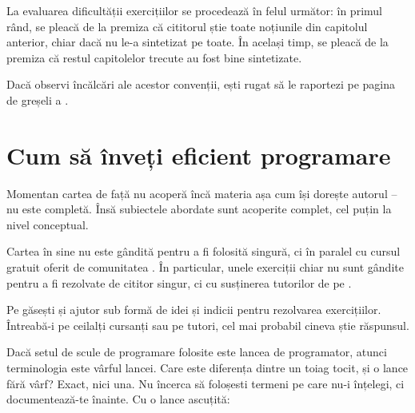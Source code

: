 La evaluarea dificultății exercițiilor se procedează în felul următor: în primul
rând, se pleacă de la premiza că cititorul știe toate noțiunile din capitolul
anterior, chiar dacă nu le-a sintetizat pe toate. În același timp, se pleacă de
la premiza că restul capitolelor trecute au fost bine sintetizate.


Dacă observi încălcări ale acestor convenții, ești rugat să le raportezi pe
pagina de greșeli a {\phpro}.

\section*{Cum să înveți eficient programare}
{}

Momentan cartea de față nu acoperă încă materia așa cum își dorește autorul --
nu este completă.  Însă subiectele abordate sunt acoperite complet, cel puțin
la nivel conceptual.

Cartea în sine nu este gândită pentru a fi folosită singură, ci în paralel cu
cursul gratuit oferit de comunitatea {\phpro}. În particular, unele exerciții
chiar nu sunt gândite pentru a fi rezolvate de cititor singur, ci cu susținerea
tutorilor de pe {\phpro}.

Pe {\phpro} găsești și ajutor sub formă de idei și indicii pentru rezolvarea
exercițiilor. Întreabă-i pe ceilalți cursanți sau pe tutori, cel mai probabil
cineva știe răspunsul.

Dacă setul de scule de programare folosite este lancea de programator, atunci
terminologia este vârful lancei.  Care este diferența dintre un toiag tocit, și
o lance fără vârf?  Exact, nici una. Nu încerca să foloșesti termeni pe care
nu-i înțelegi, ci documentează-te înainte. Cu o lance ascuțită:

